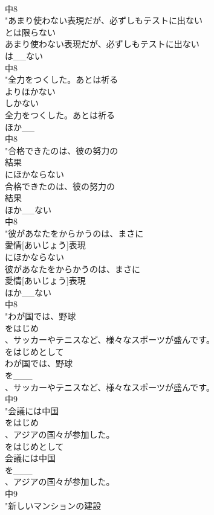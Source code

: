 \documentclass[8pt]{extreport}
\begin{document}
\begin{CJK}{UTF8}{min}
\\	中8
\\	"あまり使わない表現だが、必ずしもテストに出ない
\\	とは限らない
\\	あまり使わない表現だが、必ずしもテストに出ない
\\	は__ない
\\	中8
\\	"全力をつくした。あとは祈る
\\	よりほかない
\\	しかない 
\\	全力をつくした。あとは祈る
\\	ほか__
\\	中8
\\	"合格できたのは、彼の努力の
\\	結果
\\	にほかならない
\\	合格できたのは、彼の努力の
\\	結果
\\	ほか__ない
\\	中8
\\	"彼があなたをからかうのは、まさに
\\	愛情[あいじょう]表現
\\	にほかならない
\\	彼があなたをからかうのは、まさに
\\	愛情[あいじょう]表現
\\	ほか__ない
\\	中8
\\	"わが国では、野球
\\	をはじめ
\\	、サッカーやテニスなど、様々なスポーツが盛んです。 
\\	をはじめとして
\\	わが国では、野球
\\	を___
\\	、サッカーやテニスなど、様々なスポーツが盛んです。
\\	中9
\\	"会議には中国
\\	をはじめ
\\	、アジアの国々が参加した。 
\\	をはじめとして
\\	会議には中国
\\	を___
\\	、アジアの国々が参加した。
\\	中9
\\	"新しいマンションの建設

\end{CJK}
\end{document}
